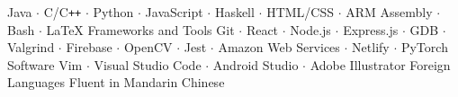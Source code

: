 

\begin{cvskills}
	{Java $\cdot$ C/C\texttt{++} $\cdot$ Python $\cdot$ JavaScript $\cdot$ Haskell $\cdot$ HTML/CSS $\cdot$ ARM Assembly $\cdot$ Bash $\cdot$ \LaTeX}
	\cvskill
	{Frameworks and Tools}
	{Git $\cdot$ React $\cdot$ Node.js $\cdot$ Express.js $\cdot$ GDB $\cdot$ Valgrind $\cdot$ Firebase $\cdot$ OpenCV $\cdot$ Jest $\cdot$ Amazon Web Services $\cdot$ Netlify $\cdot$ PyTorch}
	\cvskill
	{Software}
	{Vim $\cdot$ Visual Studio Code $\cdot$ Android Studio $\cdot$ Adobe Illustrator} 
	\cvskill
	{Foreign Languages}
	{Fluent in Mandarin Chinese}
\end{cvskills}